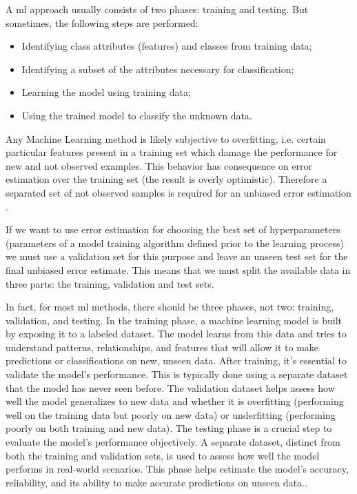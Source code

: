 A \gls{ml} approach usually consists of two phases: training and testing. But sometimes, the following steps are performed:

\begin{itemize}
\item  Identifying class attributes (features) and classes from training data;
\item  Identifying a subset of the attributes necessary for classification;
\item  Learning the model using training data;
\item  Using the trained model to classify the unknown data.
\end{itemize}

Any Machine Learning method is likely subjective to overfitting, i.e. certain particular features present in a training set which damage the performance for new and not observed examples. This behavior has consequence on error estimation over the training set (the result is overly optimistic). Therefore a separated set of not observed samples is required for an unbiased error estimation \cite{C_M_Bishop2006}. 

If we want to use error estimation for choosing the best set of hyperparameters (parameters of a model training algorithm defined prior to the learning process) we must use a validation set for this purpose and leave an unseen test set for the final unbiased error estimate. This means that we must split the available data in three parts: the training, validation and test sets.

In fact, for most \gls{ml} methods, there should be three phases, not two: training, validation, and testing. In the training phase, a machine learning model is built by exposing it to a labeled dataset. The model learns from this data and tries to understand patterns, relationships, and features that will allow it to make predictions or classifications on new, unseen data. After training, it's essential to validate the model's performance. This is typically done using a separate dataset that the model has never seen before. The validation dataset helps assess how well the model generalizes to new data and whether it is overfitting (performing well on the training data but poorly on new data) or underfitting (performing poorly on both training and new data). The testing phase is a crucial step to evaluate the model's performance objectively. A separate dataset, distinct from both the training and validation sets, is used to assess how well the model performs in real-world scenarios. This phase helps estimate the model's accuracy, reliability, and its ability to make accurate predictions on unseen data.\cite{Anna_L2016}.


